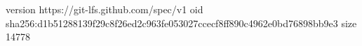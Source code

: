 version https://git-lfs.github.com/spec/v1
oid sha256:d1b51288139f29c8f26ed2c963fe053027ccecf8ff890c4962e0bd76898bb9e3
size 14778
